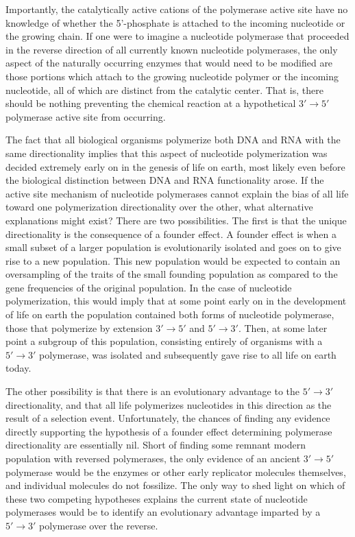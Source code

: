 Importantly, the catalytically active cations of the polymerase active site have no knowledge of whether the 5'-phosphate is attached to the incoming nucleotide or the growing chain. If one were to imagine a nucleotide polymerase that proceeded in the reverse direction of all currently known nucleotide polymerases, the only aspect of the naturally occurring enzymes that would need to be modified are those portions which attach to the growing nucleotide polymer or the incoming nucleotide, all of which are distinct from the catalytic center. That is, there should be nothing preventing the chemical reaction at a hypothetical $3'\to5'$ polymerase active site from occurring.

The fact that all biological organisms polymerize both DNA and RNA with the same directionality implies that this aspect of nucleotide polymerization was decided extremely early on in the genesis of life on earth, most likely even before the biological distinction between DNA and RNA functionality arose. If the active site mechanism of nucleotide polymerases cannot explain the bias of all life toward one polymerization directionality over the other, what alternative explanations might exist? There are two possibilities. The first is that the unique directionality is the consequence of a founder effect. A founder effect is when a small subset of a larger population is evolutionarily isolated and goes on to give rise to a new population. This new population would be expected to contain an oversampling of the traits of the small founding population as compared to the gene frequencies of the original population\cite{Templeton:1980p954}. In the case of nucleotide polymerization, this would imply that at some point early on in the development of life on earth the population contained both forms of nucleotide polymerase, those that polymerize by extension $3'\to5'$ and $5'\to3'$. Then, at some later point a subgroup of this population, consisting entirely of organisms with a $5'\to3'$ polymerase, was isolated and subsequently gave rise to all life on earth today.

The other possibility is that there is an evolutionary advantage to the $5'\to3'$ directionality, and that all life polymerizes nucleotides in this direction as the result of a selection event. Unfortunately, the chances of finding any evidence directly supporting the hypothesis of a founder effect determining polymerase directionality are essentially nil. Short of finding some remnant modern population with reversed polymerases, the only evidence of an ancient $3'\to5'$ polymerase would be the enzymes or other early replicator molecules themselves, and individual molecules do not fossilize. The only way to shed light on which of these two competing hypotheses explains the current state of nucleotide polymerases would be to identify an evolutionary advantage imparted by a $5'\to3'$ polymerase over the reverse.

